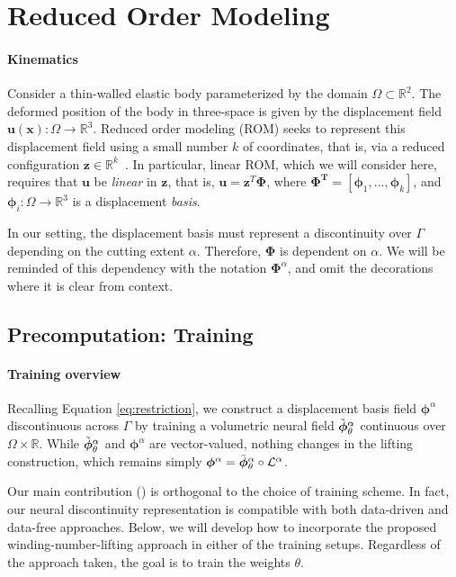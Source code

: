 

\section{Reduced Order Modeling}

\paragraph{Kinematics} Consider a thin-walled elastic body parameterized by the domain $\Omega \subset \mathbb{R}^2$. The deformed position of the body in three-space is given by the displacement field $\bm{u}(\bm{x}): \Omega \rightarrow \mathbb{R}^3$. Reduced order modeling (ROM) seeks to represent this displacement field using a small number $k$ of coordinates, that is, via a reduced configuration $\bm{z} \in \mathbb{R}^k$~\cite{An:Cubature:2008,Kim:Skipping:2009,barbivc2005real}. In particular, linear ROM, which we will consider here, requires that $\bm{u}$ be \emph{linear} in $\bm{z}$, that is, 
$\bm{u} = \bm{z}^T \bm{\Phi}$, where $\bm{\Phi^T} = [\bm{\phi}_1, \ldots, \bm{\phi}_k]$, and $\bm{\phi}_i : \Omega \rightarrow \mathbb{R}^3$ is a displacement \emph{basis}. 

In our setting, the displacement basis must represent a discontinuity over $\Gamma$ depending on the cutting extent $\alpha$. Therefore, $\bm{\Phi}$ is dependent on $\alpha$. We will be reminded of this dependency with the notation $\bm{\Phi}^\alpha$, and omit the decorations where it is clear from context. 

\subsection{Precomputation: Training}

\paragraph{Training overview}
Recalling Equation \ref{eq:restriction}, we construct a displacement basis field $\bm{\phi}^\alpha$ discontinuous across $\Gamma$ by training a volumetric neural field $\Tilde{\bm{\phi}}_\theta^\alpha$ continuous over $\Omega \times \mathbb{R}$. 
While $\Tilde{\bm{\phi}}_\theta^\alpha$ and $\bm{\phi}^\alpha$ are vector-valued, nothing changes in the lifting construction, which remains simply 
$\bm{\phi}^\alpha = \Tilde{\bm{\phi}}_\theta^\alpha \circ \mathcal{L}^{\alpha}$.

Our main contribution () is orthogonal to the choice of training scheme. In fact, our neural discontinuity representation is compatible with both data-driven and data-free approaches. Below, we will develop how to incorporate the proposed winding-number-lifting approach in either of the training setups. Regardless of the approach taken, the goal is to train the weights $\theta$.


